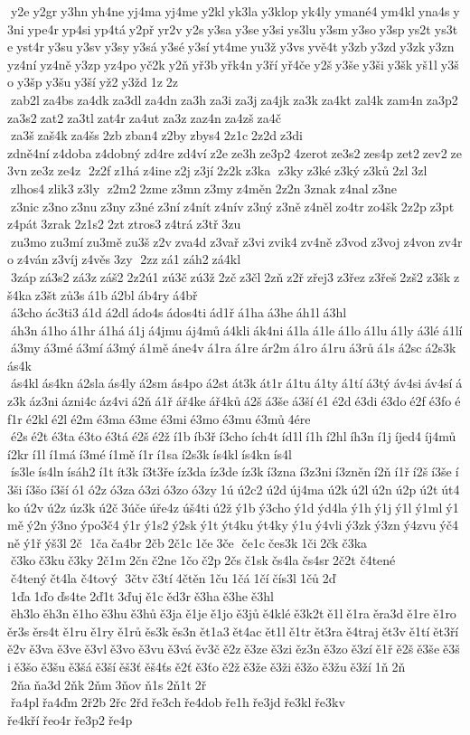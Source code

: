  y2e y2gr y3hn yh4ne yj4ma yj4me y2kl yk3la y3klop yk4ly ymané4 ym4kl yna4s y3ni ype4r yp4si yp4tá y2př yr2v y2s y3sa y3se y3si ys3lu y3sm y3so y3sp ys2t ys3te yst4r y3su y3sv y3sy y3sá y3sé y3sí yt4me yu3ž y3vs yvě4t y3zb y3zd y3zk y3zn yz4ní yz4ně y3zp yz4po yč2k y2ň yř3b yřk4n y3ří yř4če y2š y3še y3ši y3šk yš1l y3šo y3šp y3šu y3ší yž2 y3žd 1z 2z  zab2l za4bs za4dk za3dl za4dn za3h za3i za3j za4jk za3k za4kt zal4k zam4n za3p2 za3s2 zat2 za3tl zat4r za4ut za3z zaz4n za4zš za4č  za3š zaš4k za4šs 2zb zban4 z2by zbys4 2z1c 2z2d z3di 	zdně4ní z4doba z4dobný zd4re zd4ví z2e ze3h ze3p2 4zerot ze3s2 zes4p zet2 zev2 ze3vn ze3z ze4z  2z2f z1há z4ine z2j z3jí 2z2k z3ka  z3ky z3ké z3ký z3ků 2zl 3zl  zlhos4 zlik3 z3ly  z2m2 2zme z3mn z3my z4měn 2z2n 3znak z4nal z3ne  z3nic z3no z3nu z3ny z3né z3ní z4nít z4nív z3ný z3ně z4něl zo4tr zo4šk 2z2p z3pt z4pát 3zrak 2z1s2 2zt ztros3 z4trá z3tř 3zu  zu3mo zu3mí zu3mě zu3š z2v zva4d z3vař z3vi zvik4 zv4ně z3vod z3voj z4von zv4ro z4ván z3víj z4věs 3zy  2zz zá1 záh2 zá4kl  3záp zá3s2 zá3z záš2 2z2ú1 zú3č zú3ž 2zč z3čl 2zň z2ř zřej3 z3řez z3řeš 2zš2 z3šk zš4ka z3št zů3s á1b á2bl áb4ry á4bř  á3cho ác3ti3 á1d á2dl ádo4s ádos4ti ád1ř á1ha á3he áh1l á3hl  áh3n á1ho á1hr á1há á1j á4jmu áj4mů á4kli ák4ni á1la á1le á1lo á1lu á1ly á3lé á1lí á3my á3mé á3mí á3mý á1mě áne4v á1ra á1re ár2m á1ro á1ru á3rů á1s á2sc á2s3k ás4k  ás4kl ás4kn á2sla ás4ly á2sm ás4po á2st át3k át1r á1tu á1ty á1tí á3tý áv4si áv4sí áz3k áz3ni ázni4c áz4vi á2ň á1ř ář4ke ář4ků á2š á3še á3ší é1 é2d é3di é3do é2f é3fo éf1r é2kl é2l é2m é3ma é3me é3mi é3mo é3mu é3mů 4ére  é2s é2t é3ta é3to é3tá é2š é2ž í1b íb3ř í3cho ích4t íd1l í1h í2hl íh3n í1j íjed4 íj4mů í2kr í1l í1má í3mé í1mě í1r í1sa í2s3k ís4kl ís4kn ís4l  ís3le ís4ln ísáh2 í1t ít3k í3t3ře íz3da íz3de íz3k í3zna í3z3ni í3zněn í2ň í1ř í2š í3še í3ši í3šo í3ší ó1 ó2z ó3za ó3zi ó3zo ó3zy 1ú ú2c2 ú2d új4ma ú2k ú2l ú2n ú2p ú2t út4ko ú2v ú2z úz3k ú2č 3úče úře4z úš4ti ú2ž ý1b ý3cho ý1d ýd4la ý1h ý1j ý1l ý1ml ý1mě ý2n ý3no ýpo3č4 ý1r ý1s2 ý2sk ý1t ýt4ku ýt4ky ý1u ý4vli ý3zk ý3zn ý4zvu ýč4ně ý1ř ýš3l 2č  1ča ča4br 2čb 2č1c 1če 3če  če1c čes3k 1či 2čk č3ka  č3ko č3ku č3ky 2č1m 2čn č2ne 1čo č2p 2čs č1sk čs4la čs4sr 2č2t 	č4tené  č4tený čt4la 	č4tový  3čtv č3tí 4čtěn 1ču 1čá 1čí čís3l 1čů 2ď  1ďa 1ďo ďs4te 2ď1t 3ďuj ě1c ěd3r ě3ha ě3he ě3hl  ěh3lo ěh3n ě1ho ě3hu ě3hů ě3ja ě1je ě1jo ě3jů ě4klé ě3k2t ě1l ě1ra ěra3d ě1re ě1ro ěr3s ěrs4t ě1ru ě1ry ě1rů ěs3k ěs3n ět1a3 ět4ac ět1l ě1tr ět3ra ě4traj ět3v ě1tí ět3ří ě2v ě3va ě3ve ě3vl ě3vo ě3vu ě3vá ěv3č ě2z ě3ze ě3zi ěz3n ě3zo ě3zí ě1ř ě2š ě3še ě3ši ě3šo ě3šu ě3šá ě3ší ěš3ť ěš4ťs ě2ť ě3ťo ě2ž ě3že ě3ži ě3žo ě3žu ě3ží 1ň 2ň  2ňa ňa3d 2ňk 2ňm 3ňov ň1s 2ň1t 2ř  řa4pl řa4ďm 2ř2b 2řc 2řd ře3ch ře4dob ře1h ře3jd ře3kl ře3kv 	ře4kří řeo4r ře3p2 ře4p 